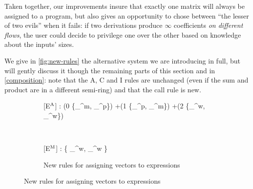 \documentclass[runningheads]{llncs}
\newcommand\infer{\Infer}
\newcommand{\pr}{\lstinline[mathescape]}
\renewcommand{\oplus}{+}
\begin{document}
Taken together, our improvements insure that exactly one matrix will always be assigned to a program, but also gives an opportunity to chose between \enquote{the lesser of two evils} when it fails: if two derivations produce \(\infty\) coefficients \emph{on different flows}, the user could decide to privilege one over the other based on knowledge about the inputs' sizes.

We give in \autoref{fig:new-rules} the alternative system we are introducing in full, but will gently discuss it though the remaining parts of this section and in \autoref{composition}: note that the A, C and I rules are unchanged (even if the sum and product are in a different semi-ring) and that the call rule is new.

\begin{figure}
	\begin{subfigure}{\textwidth}
		\begin{centering}
			\begin{prooftree}[small]
				\infer[left label={$\star\in\{+, -\}$}]0[E\(^{\textsc{A}}\)]{\vdash \text{\pr|Xi $\star$ Xj|} : (0 \mapsto \{_{\text{\pr|i|}}^{m}, _{\text{\pr|j|}}^{p}\}) \oplus (1 \mapsto \{_{\text{\pr|i|}}^{p}, _{\text{\pr|j|}}^{m}\}) \oplus (2 \mapsto \{_{\text{\pr|i|}}^{w}, _{\text{\pr|j|}}^{w}\})}
			\end{prooftree}
			\\[2em]
			\begin{prooftree}[small]
				\infer0[E\(^{\textsc{M}}\)]{ \vdash \text{\pr|Xi * Xj|} : \{ _{\text{\pr|i|}}^{w}, _{\text{\pr|j|}}^{w} \}}
			\end{prooftree}
			\caption{New rules for assigning vectors to expressions}
			\label{fig:new-rules-expressions}
		\end{centering}
	\end{subfigure}


\end{figure}
\end{document}
